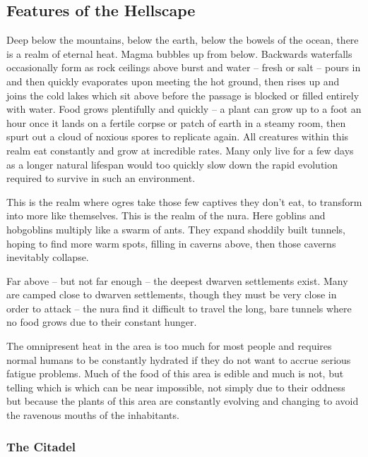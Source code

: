 \begin{multicols}{2}

\subsection{Features of the Hellscape}

Deep below the mountains, below the earth, below the bowels of the ocean, there is a realm of eternal heat.
Magma bubbles up from below.
Backwards waterfalls occasionally form as rock ceilings above burst and water -- fresh or salt -- pours in and then quickly evaporates upon meeting the hot ground, then rises up and joins the cold lakes which sit above before the passage is blocked or filled entirely with water.
Food grows plentifully and quickly -- a plant can grow up to a foot an hour once it lands on a fertile corpse or patch of earth in a steamy room, then spurt out a cloud of noxious spores to replicate again.
All creatures within this realm eat constantly and grow at incredible rates.
Many only live for a few days as a longer natural lifespan would too quickly slow down the rapid evolution required to survive in such an environment.

  This is the realm where ogres take those few captives they don't eat, to transform into more like themselves.
  This is the realm of the nura.
  Here goblins and hobgoblins multiply like a swarm of ants.
  They expand shoddily built tunnels, hoping to find more warm spots, filling in caverns above, then those caverns inevitably collapse.

  Far above -- but not far enough -- the deepest dwarven settlements exist.
  Many are camped close to dwarven settlements, though they must be very close in order to attack -- the nura find it difficult to travel the long, bare tunnels where no food grows due to their constant hunger.

  The omnipresent heat in the area is too much for most people and requires normal humans to be constantly hydrated if they do not want to accrue serious fatigue problems.
  Much of the food of this area is edible and much is not, but telling which is which can be near impossible, not simply due to their oddness but because the plants of this area are constantly evolving and changing to avoid the ravenous mouths of the inhabitants.


\subsubsection{The Citadel}


\end{multicols}
